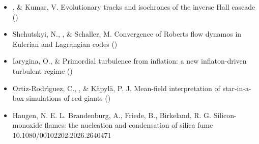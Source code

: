 

\begin{itemize}

\item[{487.}~]
\Brandenburg, \& Kumar, V.
{Evolutionary tracks and isochrones of the inverse Hall cascade}
()

\item[{486.}~]
Shchutskyi, N., \Brandenburg, \& Schaller, M.
{Convergence of Roberts flow dynamos in Eulerian and Lagrangian codes}
()

\item[{485.}~]
Iarygina, O., \& \Brandenburg{}
{Primordial turbulence from inflation: a new inflaton-driven turbulent regime}
()

\item[{484.}~]
Ortiz-Rodr{\'\i}guez, C., \Brandenburg, \& K\"apyl\"a, P. J.
{Mean-field interpretation of star-in-a-box simulations of red giants}
()


\end{itemize}



\begin{itemize}

\item[{483.}~]
Haugen, N. E. L. Brandenburg, A., Friede, B., Birkeland, R. G.
{Silicon-monoxide flames: the nucleation and condensation of silica fume}
{10.1080/00102202.2026.2640471}

\end{itemize}

